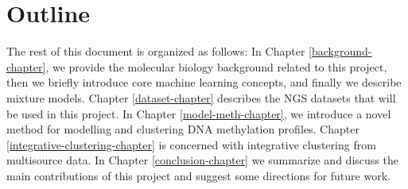\section{Outline} \label{outline-intro-l}
The rest of this document is organized as follows: In Chapter \ref{background-chapter}, we provide the molecular biology background related to this project, then we briefly introduce core machine learning concepts, and finally we describe mixture models. Chapter \ref{dataset-chapter} describes the NGS datasets that will be used in this project. In Chapter \ref{model-meth-chapter}, we introduce a novel method for modelling and clustering DNA methylation profiles. Chapter \ref{integrative-clustering-chapter} is concerned with integrative clustering from multisource data. In Chapter \ref{conclusion-chapter} we summarize and discuss the main contributions of this project and suggest some directions for future work.